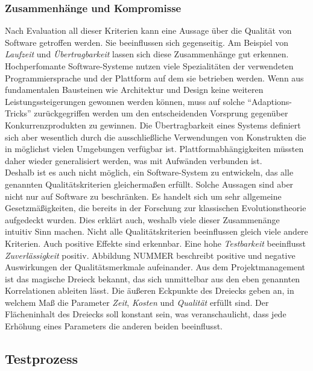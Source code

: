 \subsubsection{Zusammenhänge und Kompromisse} 
Nach Evaluation all dieser Kriterien kann eine Aussage über die Qualität von Software getroffen werden. Sie beeinflussen sich gegenseitig. Am Beispiel von \textit{Laufzeit} und \textit{Übertragbarkeit} lassen sich diese Zusammenhänge gut erkennen. Hochperfomante Software-Systeme nutzen viele Spezialitäten der verwendeten Programmiersprache und der Plattform auf dem sie betrieben werden. Wenn aus fundamentalen Bausteinen wie Architektur und Design keine weiteren Leistungssteigerungen gewonnen werden können, muss auf solche ``Adaptions-Tricks'' zurückgegriffen werden um den entscheidenden Vorsprung gegenüber Konkurrenzprodukten zu gewinnen. Die Übertragbarkeit eines Systems definiert sich aber wesentlich durch die ausschließliche Verwendungen von Konstrukten die in möglichst vielen Umgebungen verfügbar ist. Plattformabhängigkeiten müssten daher wieder generalisiert werden, was mit Aufwänden verbunden ist.\\
Deshalb ist es auch nicht möglich, ein Software-System zu entwickeln, das alle genannten Qualitätskriterien gleichermaßen erfüllt. Solche Aussagen sind aber nicht nur auf Software zu beschränken. Es handelt sich um sehr allgemeine Gesetzmäßigkeiten, die bereits in der Forschung zur klassischen Evolutionstheorie aufgedeckt wurden.\cite{hoffmann_software-qualitat_2013} Dies erklärt auch, weshalb viele dieser Zusammenänge intuitiv Sinn machen. Nicht alle Qualitätskriterien beeinflussen gleich viele andere Kriterien. Auch positive Effekte sind erkennbar. Eine hohe \textit{Testbarkeit} beeinflusst \textit{Zuverlässigkeit} positiv. Abbildung NUMMER beschreibt positive und negative Auswirkungen der Qualitätsmerkmale aufeinander. Aus dem Projektmanagement ist das magische Dreieck bekannt, das sich unmittelbar aus den eben genannten Korrelationen ableiten lässt. Die äußeren Eckpunkte des Dreiecks geben an, in welchem Maß die Parameter \textit{Zeit}, \textit{Kosten} und \textit{Qualität} erfüllt sind. Der Flächeninhalt des Dreiecks soll konstant sein, was veranschaulicht, dass jede Erhöhung eines Parameters die anderen beiden beeinflusst.  

\subsection{Testprozess}
